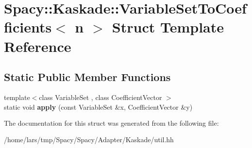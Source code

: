 \hypertarget{structSpacy_1_1Kaskade_1_1VariableSetToCoefficients}{}\section{Spacy\+:\+:Kaskade\+:\+:Variable\+Set\+To\+Coefficients$<$ n $>$ Struct Template Reference}
\label{structSpacy_1_1Kaskade_1_1VariableSetToCoefficients}
\subsection*{Static Public Member Functions}
\begin{DoxyCompactItemize}
\item 
{\footnotesize template$<$class Variable\+Set , class Coefficient\+Vector $>$ }\\static void {\bfseries apply} (const Variable\+Set \&x, Coefficient\+Vector \&y)\hypertarget{structSpacy_1_1Kaskade_1_1VariableSetToCoefficients_a141fc5818b45f0fbeeca73a37cfff841}{}\label{structSpacy_1_1Kaskade_1_1VariableSetToCoefficients_a141fc5818b45f0fbeeca73a37cfff841}

\end{DoxyCompactItemize}


The documentation for this struct was generated from the following file\+:\begin{DoxyCompactItemize}
\item 
/home/lars/tmp/\+Spacy/\+Spacy/\+Adapter/\+Kaskade/util.\+hh\end{DoxyCompactItemize}
